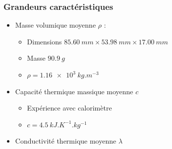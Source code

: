 \documentclass[a4paper,11pt]{beamer}
\begin{document}
\begin{frame}
    \frametitle{Grandeurs caractéristiques}

    \begin{itemize}
        \item Masse volumique moyenne $\rho$ :
        \begin{itemize}
            \item Dimensions $\SI{85,60}{mm} \times \SI{53,98}{mm} \times \SI{17,00}{mm}$
            \item Masse $\SI{90,9}{g}$
            \item $\rho = \SI{1.16e3}{kg.m^{-3}}$
        \end{itemize}
        \item Capacité thermique massique moyenne $c$
        \begin{itemize}
            \item Expérience avec calorimètre
            \item $c = \SI{4,5}{kJ.K^{-1}.kg^{-1}}$
        \end{itemize}
        \item Conductivité thermique moyenne $\lambda$
    \end{itemize}
\end{frame}
\end{document}

